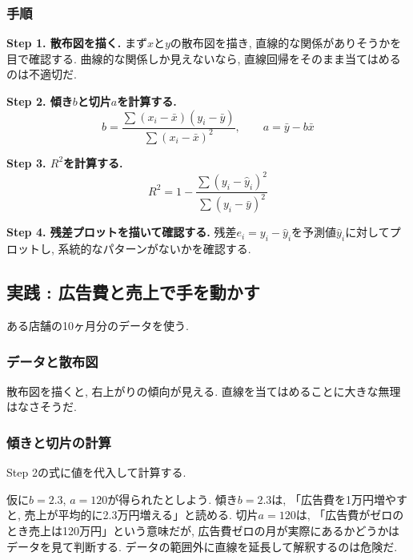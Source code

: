 \subsubsection*{手順}

\textbf{Step 1. 散布図を描く.}
まず$x$と$y$の散布図を描き, 直線的な関係がありそうかを目で確認する.
曲線的な関係しか見えないなら, 直線回帰をそのまま当てはめるのは不適切だ.

\textbf{Step 2. 傾き$b$と切片$a$を計算する.}
\[
  b = \frac{\sum(x_i - \bar{x})(y_i - \bar{y})}{\sum(x_i - \bar{x})^2}, \qquad a = \bar{y} - b\bar{x}
\]

\textbf{Step 3. $R^2$を計算する.}
\[
  R^2 = 1 - \frac{\sum(y_i - \hat{y}_i)^2}{\sum(y_i - \bar{y})^2}
\]

\textbf{Step 4. 残差プロットを描いて確認する.}
残差$e_i = y_i - \hat{y}_i$を予測値$\hat{y}_i$に対してプロットし, 系統的なパターンがないかを確認する.


\subsection{実践 : 広告費と売上で手を動かす}

ある店舗の10ヶ月分のデータを使う.


\subsubsection*{データと散布図}


散布図を描くと, 右上がりの傾向が見える.
直線を当てはめることに大きな無理はなさそうだ.

\subsubsection*{傾きと切片の計算}

Step 2の式に値を代入して計算する.


仮に$b = 2.3$, $a = 120$が得られたとしよう.
傾き$b = 2.3$は, 「広告費を1万円増やすと, 売上が平均的に2.3万円増える」と読める.
切片$a = 120$は, 「広告費がゼロのとき売上は120万円」という意味だが, 広告費ゼロの月が実際にあるかどうかはデータを見て判断する.
データの範囲外に直線を延長して解釈するのは危険だ.

